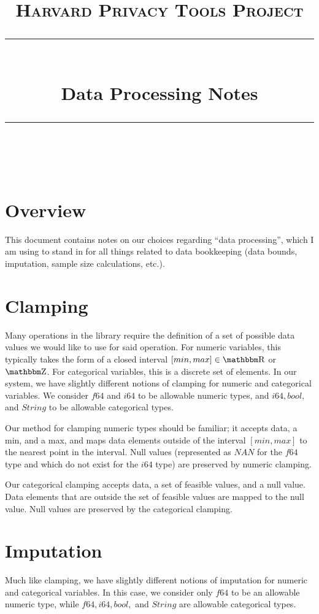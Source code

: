 \documentclass[11pt]{scrartcl} %
\title{
	\normalfont\normalsize
	\textsc{Harvard Privacy Tools Project}\\ %
	\vspace{25pt} %
	\rule{\linewidth}{0.5pt}\\ %
	\vspace{20pt} %
	{\huge Data Processing Notes}\\ %
	\vspace{12pt} %
	\rule{\linewidth}{2pt}\\ %
	\vspace{12pt} %
}
\author{} %
\date{} %
\begin{document}
\maketitle

\section{Overview}
This document contains notes on our choices regarding ``data processing'', which I am using to stand in
for all things related to data bookkeeping (data bounds, imputation, sample size calculations, etc.).

\section{Clamping}
Many operations in the library require the definition of a set of possible data values
we would like to use for said operation. For numeric variables, this typically
takes the form of a closed interval $[min, max] \in \R$ or $\Z$. For categorical
variables, this is a discrete set of elements.
In our system, we have slightly different notions of clamping for numeric and categorical variables.
We consider $f64$ and $i64$ to be allowable numeric types, and $i64, bool,$ and $String$ to be
allowable categorical types. \newline

Our method for clamping numeric types should be familiar; it accepts data, a min, and a max,
and maps data elements outside of the interval $[min, max]$ to the nearest point in the interval.
Null values (represented as $NAN$ for the $f64$ type and which do not exist for the $i64$ type)
are preserved by numeric clamping. \newline

Our categorical clamping accepts data, a set of feasible values, and a null value.
Data elements that are outside the set of feasible values are mapped to the null value.
Null values are preserved by the categorical clamping. \newline

\section{Imputation}
Much like clamping, we have slightly different notions of imputation for numeric and categorical variables.
In this case, we consider only $f64$ to be an allowable numeric type, while
$f64, i64, bool,$ and $String$ are allowable categorical types. \newline
\end{document}
